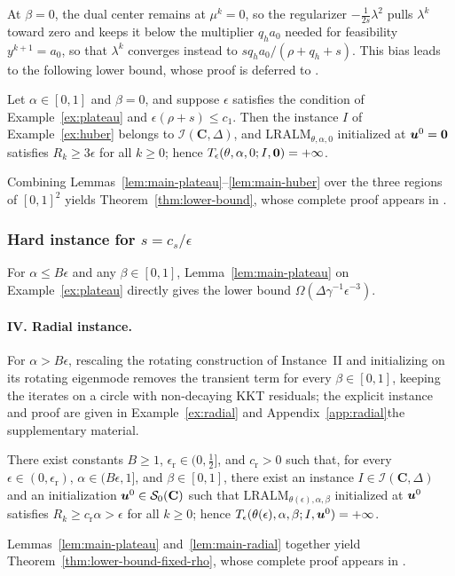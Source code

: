 At \(\beta=0\), the dual center remains at \(\mu^k=0\), so the regularizer
\(-\frac{1}{2s}\lambda^2\) pulls \(\lambda^k\) toward zero and keeps it below
the multiplier \(q_ha_0\) needed for feasibility \(y^{k+1}=a_0\), so that
\(\lambda^k\) converges instead to \(sq_ha_0/(\rho+q_h+s)\). This bias leads to the following lower
bound, whose proof is deferred to .

\begin{lemma}
\label{lem:main-huber}
Let \(\alpha\in[0,1]\) and \(\beta=0\), and suppose \(\epsilon\) satisfies
the condition of Example~\ref{ex:plateau} and \(\epsilon(\rho+s)\le c_1\).
Then the instance \(I\) of Example~\ref{ex:huber} belongs to
\(\mathcal I(\mathbf C,\Delta)\), and \(\mathrm{LRALM}_{\theta,\alpha,0}\)
initialized at \(\bm{u}^0=\bm{0}\) satisfies \(R_k\ge3\epsilon\) for all
\(k\ge0\); hence \(T_\epsilon(\theta,\alpha,0;I,\bm{0})=+\infty\).
\end{lemma}

Combining Lemmas~\ref{lem:main-plateau}--\ref{lem:main-huber} over the three
regions of \([0,1]^2\) yields Theorem~\ref{thm:lower-bound}, whose complete
proof appears in .

\subsubsection{Hard instance for \texorpdfstring{\(s=c_s/\epsilon\)}{s = cs/epsilon}}

For \(\alpha\le B\epsilon\) and any \(\beta\in[0,1]\),
Lemma~\ref{lem:main-plateau} on Example~\ref{ex:plateau} directly gives the
lower bound \(\Omega(\Delta\gamma^{-1}\epsilon^{-3})\).

\paragraph{IV. Radial instance.}
For \(\alpha>B\epsilon\), rescaling the rotating construction of Instance~II and
initializing on its rotating eigenmode removes the transient term for every
\(\beta\in[0,1]\), keeping the iterates on a circle with non-decaying KKT
residuals; the explicit instance and proof are given in
\ifsupp Example~\ref{ex:radial} and Appendix~\ref{app:radial}\else the
supplementary material\fi.

\begin{lemma}
\label{lem:main-radial}
There exist constants \(B\ge1\), \(\epsilon_{\mathrm{r}}\in(0,\tfrac12]\), and
\(c_{\mathrm{r}}>0\) such that, for every \(\epsilon\in(0,\epsilon_{\mathrm{r}})\),
\(\alpha\in(B\epsilon,1]\), and \(\beta\in[0,1]\), there exist an
instance \(I\in\mathcal I(\mathbf C,\Delta)\) and an initialization
\(\bm{u}^0\in\mathcal S_0(\mathbf C)\) such that
\(\mathrm{LRALM}_{\theta(\epsilon),\alpha,\beta}\) initialized at \(\bm{u}^0\)
satisfies \(R_k\ge c_{\mathrm{r}}\alpha>\epsilon\) for all \(k\ge0\); hence
\(T_\epsilon(\theta(\epsilon),\alpha,\beta;I,\bm{u}^0)=+\infty\).
\end{lemma}

Lemmas~\ref{lem:main-plateau} and~\ref{lem:main-radial} together yield
Theorem~\ref{thm:lower-bound-fixed-rho}, whose complete proof appears in
.
